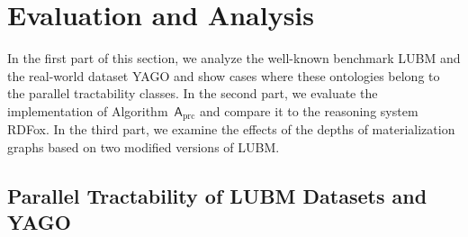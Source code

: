 \section{Evaluation and Analysis}
\label{sec:evaluation}

In the first part of this section, we analyze the well-known benchmark LUBM
and the real-world dataset YAGO and
show cases where these ontologies belong to the parallel tractability classes.
%
In the second part, we evaluate the implementation of Algorithm~$\mathsf{A}_{\text{prc}}$
and compare it to the reasoning system RDFox.
%
In the third part, we examine the effects of the depths of materialization graphs
based on two modified versions of LUBM.



\subsection{Parallel Tractability of LUBM Datasets and YAGO}
\label{sec:lubm-yago}


